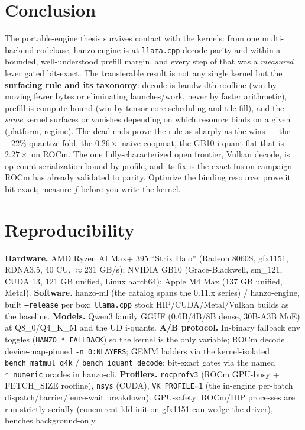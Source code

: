 \documentclass[11pt]{article}
\newcommand{\x}{\ensuremath{\times}}
\begin{document}
\section{Conclusion}
The portable-engine thesis survives contact with the kernels: from one multi-backend codebase,
hanzo-engine is at \texttt{llama.cpp} decode parity and within a bounded, well-understood prefill
margin, and every step of that was a \emph{measured} lever gated bit-exact. The transferable result
is not any single kernel but the \textbf{surfacing rule and its taxonomy}: decode is
bandwidth-roofline (win by moving fewer bytes or eliminating launches/work, never by faster
arithmetic), prefill is compute-bound (win by tensor-core scheduling and tile fill), and the
\emph{same} kernel surfaces or vanishes depending on which resource binds on a given (platform,
regime). The dead-ends prove the rule as sharply as the wins --- the $-22\%$ quantize-fold, the
$0.26\x$ naive coopmat, the GB10 i-quant flat that is $2.27\x$ on ROCm. The one fully-characterized
open frontier, Vulkan decode, is op-count-serialization-bound by profile, and its fix is the exact
fusion campaign ROCm has already validated to parity. Optimize the binding resource; prove it
bit-exact; measure $f$ before you write the kernel.

\appendix
\section{Reproducibility}
\textbf{Hardware.} AMD Ryzen AI Max+ 395 ``Strix Halo'' (Radeon 8060S, gfx1151, RDNA3.5, 40 CU,
$\approx$231 GB/s); NVIDIA GB10 (Grace-Blackwell, sm\_121, CUDA 13, 121 GB unified, Linux aarch64);
Apple M4 Max (137 GB unified, Metal). \textbf{Software.} hanzo-ml (the catalog spans the 0.11.x
series) / hanzo-engine, built \texttt{--release} per box; \texttt{llama.cpp} stock HIP/CUDA/Metal/Vulkan
builds as the baseline. \textbf{Models.} Qwen3 family GGUF (0.6B/4B/8B dense, 30B-A3B MoE) at
Q8\_0/Q4\_K\_M and the UD i-quants. \textbf{A/B protocol.} In-binary fallback env toggles
(\texttt{HANZO\_*\_FALLBACK}) so the kernel is the only variable; ROCm decode device-map-pinned
\texttt{-n 0:NLAYERS}; GEMM ladders via the kernel-isolated \texttt{bench\_matmul\_q4k} /
\texttt{bench\_iquant\_decode}; bit-exact gates via the named \texttt{*\_numeric} oracles in
hanzo-cli. \textbf{Profilers.} \texttt{rocprofv3} (ROCm GPU-busy + FETCH\_SIZE roofline),
\texttt{nsys} (CUDA), \texttt{VK\_PROFILE=1} (the in-engine per-batch dispatch/barrier/fence-wait
breakdown). GPU-safety: ROCm/HIP processes are run strictly serially (concurrent kfd init on
gfx1151 can wedge the driver), benches background-only.
\end{document}
